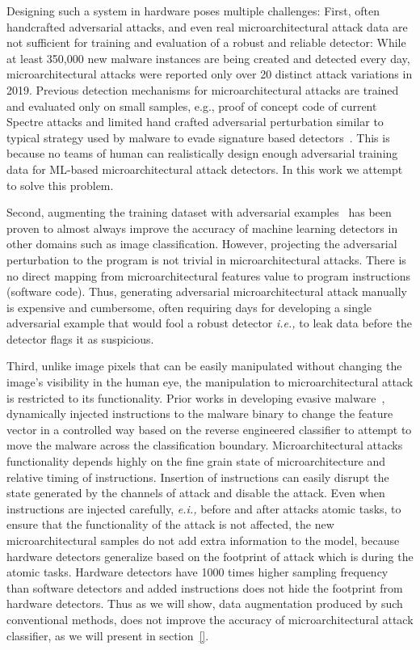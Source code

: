 Designing such a system in hardware poses multiple challenges: First, often handcrafted adversarial attacks, and even real microarchitectural attack data are not sufficient for training and evaluation of a robust and reliable detector: While at least 350,000 new malware instances are being created and detected every day, microarchitectural attacks were reported only over 20 distinct attack variations in 2019. 
Previous detection mechanisms for microarchitectural attacks are trained and evaluated only on small samples, e.g., proof of concept code of current Spectre attacks and limited hand crafted adversarial perturbation similar to typical strategy 
used by malware to evade signature based
detectors~\cite{PaulKocher,paulKocherSpectreAttacks}. This is because no teams of human can realistically design enough adversarial training data for ML-based microarchitectural attack detectors. In this work we attempt to solve this problem. 



Second, augmenting the training dataset with adversarial examples~\cite{szegedy2014going, Goodfellow2015ADVexample, moosavidezfooli2016deepfool} has been proven to almost always improve the accuracy of machine learning detectors in other domains such as image classification. However,  projecting the adversarial perturbation to the program is not trivial in microarchitectural attacks. There is no direct mapping from microarchitectural features value to program instructions (software code). Thus, generating adversarial microarchitectural attack manually is  expensive and cumbersome, often requiring days for developing a single adversarial example that would fool a robust detector {\em i.e.,} to leak data before the detector flags it as suspicious.

Third, unlike image pixels that can be easily manipulated without changing the image's visibility in the human eye, the manipulation to microarchitectural attack is restricted to its functionality. Prior works in developing evasive malware~\cite{RHMD2017}, dynamically injected instructions to the malware binary to change the feature vector in a controlled way based on the reverse engineered classifier to attempt to move the malware across the classification boundary. Microarchitectural attacks functionality depends highly on the fine grain state of microarchitecture and relative timing of instructions. Insertion of instructions can easily disrupt the state generated by the channels of attack and disable the attack.  Even when instructions are injected carefully, {\em e.i.,} before and after attacks atomic tasks, to ensure that the functionality of the attack is not affected, the new microarchitectural samples do not add extra information to the model, because hardware detectors generalize based on the footprint of attack which is during the atomic tasks. Hardware detectors have 1000 times higher sampling frequency than software detectors and added instructions  does not hide the footprint from hardware detectors. Thus as we will show, data augmentation produced by such conventional methods, does not improve the accuracy of  microarchitectural attack classifier, as we will present in section~\ref{}. 



